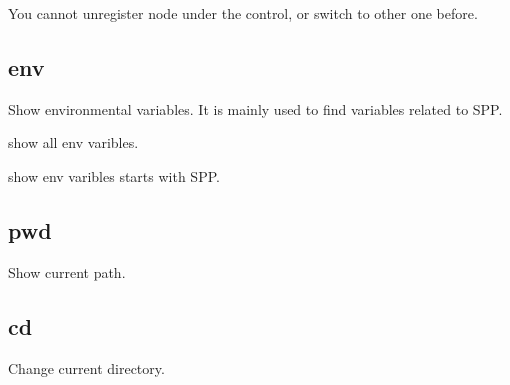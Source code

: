 \documentclass[a4paper,11pt,openany,oneside,english]{sphinxmanual}
\begin{document}
You cannot unregister node under the control, or switch to other one before.

\begin{sphinxVerbatim}[commandchars=\\\{\},formatcom=\footnotesize]
\end{sphinxVerbatim}


\subsection{env}
\label{\detokenize{commands/common:env}}\label{\detokenize{commands/common:commands-common-env}}
Show environmental variables. It is mainly used to find variables related to
SPP.

\begin{sphinxVerbatim}[commandchars=\\\{\},formatcom=\footnotesize]
 show all env varibles.

 show env varibles starts with SPP.
\end{sphinxVerbatim}


\subsection{pwd}
\label{\detokenize{commands/common:pwd}}\label{\detokenize{commands/common:commands-common-pwd}}
Show current path.

\begin{sphinxVerbatim}[commandchars=\\\{\},formatcom=\footnotesize]
\end{sphinxVerbatim}


\subsection{cd}
\label{\detokenize{commands/common:cd}}\label{\detokenize{commands/common:commands-common-cd}}
Change current directory.

\begin{sphinxVerbatim}[commandchars=\\\{\},formatcom=\footnotesize]
\end{sphinxVerbatim}
\end{document}
